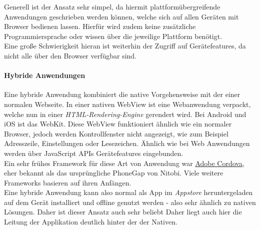 Generell ist der Ansatz sehr simpel, da hiermit plattformübergreifende Anwendungen geschrieben werden können, welche sich auf allen Geräten mit Browser bedienen lassen. 
Hierfür wird zudem keine zusätzliche Programmiersprache oder wissen über die jeweilige Plattform benötigt.\\
Eine große Schwierigkeit hieran ist weiterhin der Zugriff auf Gerätefeatures, da nicht alle über den Browser verfügbar sind.

\paragraph{Hybride Anwendungen}
\label{hybride_anwendung}
Eine hybride Anwendung kombiniert die native Vorgehensweise mit der einer normalen Webseite. 
In einer nativen WebView ist eine Webanwendung verpackt, welche nun in einer \textit{HTML-Rendering-Engine} gerendert wird. Bei Android und iOS ist das WebKit.
Diese WebView funktioniert ähnlich wie ein normaler Browser, jedoch werden Kontrollfenster nicht angezeigt, wie zum Beispiel Adresszeile, Einstellungen oder Lesezeichen.
Ähnlich wie bei Web Anwendungen werden über JavaScript APIs Gerätefeatures eingebunden.\\
Ein sehr frühes Framework für diese Art von Anwendung war \href{https://cordova.apache.org/}{Adobe Cordova}, eher bekannt als das ursprüngliche PhoneGap von Nitobi. Viele weitere Frameworks basieren auf ihren Anfängen.\\

Eine hybride Anwendung kann also normal als App im \textit{Appstore} heruntergeladen auf dem Gerät installiert und offline genutzt werden - also sehr ähnlich zu nativen Lösungen. Daher ist dieser Ansatz auch sehr beliebt 
Daher liegt auch hier die Leitung der Applikation deutlich hinter der der Nativen. \cite{lachgar2017} \cite{bjorn-hansen2020}

